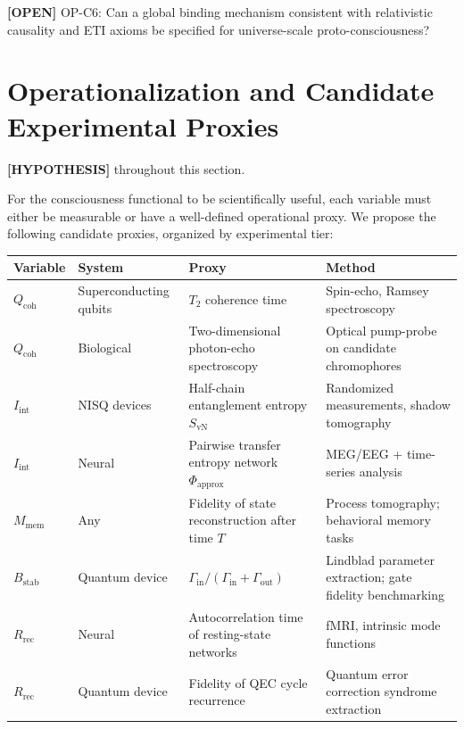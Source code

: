 \documentclass[12pt,letterpaper]{article}
\newcommand{\HYPOTHESIS}[1]{\textcolor{blue!70!black}{\textbf{[HYPOTHESIS]}} #1}
\newcommand{\OPEN}[1]{\textcolor{red!70!black}{\textbf{[OPEN]}} #1}
\newcommand{\Qcoh}{Q_{\mathrm{coh}}}
\newcommand{\Iint}{I_{\mathrm{int}}}
\newcommand{\Mmem}{M_{\mathrm{mem}}}
\newcommand{\Bstab}{B_{\mathrm{stab}}}
\newcommand{\Rrec}{R_{\mathrm{rec}}}
\begin{document}
\OPEN{OP-C6: Can a global binding mechanism consistent with relativistic
causality and ETI axioms be specified for universe-scale proto-consciousness?}

\section{Operationalization and Candidate Experimental Proxies}
\label{sec:experimental}

\HYPOTHESIS{} throughout this section.

For the consciousness functional to be scientifically useful, each variable
must either be measurable or have a well-defined operational proxy. We
propose the following candidate proxies, organized by experimental tier:

\begin{center}
\begin{tabular}{p{1.4cm} p{2.8cm} p{3.6cm} p{3.5cm}}
\toprule
\textbf{Variable} & \textbf{System} & \textbf{Proxy} & \textbf{Method} \\
\midrule
$\Qcoh$ & Superconducting qubits &
  $T_2$ coherence time &
  Spin-echo, Ramsey spectroscopy \\
$\Qcoh$ & Biological &
  Two-dimensional photon-echo spectroscopy &
  Optical pump-probe on candidate chromophores \\
\addlinespace
$\Iint$ & NISQ devices &
  Half-chain entanglement entropy $S_{\mathrm{vN}}$ &
  Randomized measurements, shadow tomography \\
$\Iint$ & Neural &
  Pairwise transfer entropy network $\Phi_\mathrm{approx}$ &
  MEG/EEG + time-series analysis \\
\addlinespace
$\Mmem$ & Any &
  Fidelity of state reconstruction after time $T$ &
  Process tomography; behavioral memory tasks \\
\addlinespace
$\Bstab$ & Quantum device &
  $\Gamma_{\mathrm{in}} / (\Gamma_{\mathrm{in}} + \Gamma_{\mathrm{out}})$ &
  Lindblad parameter extraction; gate fidelity benchmarking \\
\addlinespace
$\Rrec$ & Neural &
  Autocorrelation time of resting-state networks &
  fMRI, intrinsic mode functions \\
$\Rrec$ & Quantum device &
  Fidelity of QEC cycle recurrence &
  Quantum error correction syndrome extraction \\
\bottomrule
\end{tabular}
\end{center}
\end{document}
